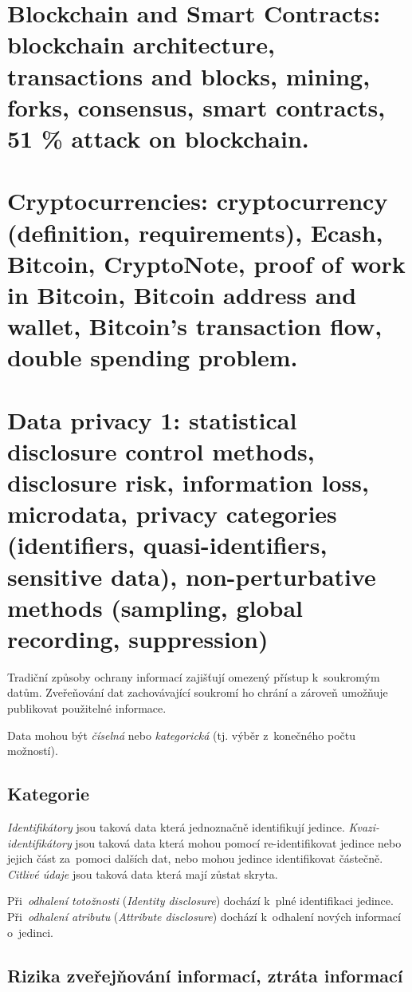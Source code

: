 \clearpage
\section{Blockchain and Smart Contracts: blockchain architecture, transactions and blocks, mining, forks, consensus, smart contracts, 51 \% attack on blockchain.}

\clearpage
\section{Cryptocurrencies: cryptocurrency (definition, requirements), Ecash, Bitcoin, CryptoNote, proof of work in Bitcoin, Bitcoin address and wallet, Bitcoin’s transaction flow, double spending problem.}



\clearpage
\section{Data privacy 1: statistical disclosure control methods, disclosure risk, information loss, microdata, privacy categories (identifiers, quasi-identifiers, sensitive data), non-perturbative methods (sampling, global recording, suppression)}

Tradiční způsoby ochrany informací zajišťují omezený přístup k~soukromým datům.
Zveřeňování dat zachovávající soukromí ho chrání a zároveň umožňuje publikovat použitelné informace.

Data mohou být \emph{číselná} nebo \emph{kategorická} (tj. výběr z~konečného počtu možností).


\subsection{Kategorie}

\emph{Identifikátory} jsou taková data která jednoznačně identifikují jedince.
\emph{Kvazi-identifikátory} jsou taková data která mohou pomocí re-identifikovat jedince nebo jejich část za~pomoci dalších dat, nebo mohou jedince identifikovat částečně.
\emph{Citlivé údaje} jsou taková data která mají zůstat skryta.

Při~\emph{odhalení totožnosti} (\emph{Identity disclosure}) dochází k~plné identifikaci jedince.
Při~\emph{odhalení atributu} (\emph{Attribute disclosure}) dochází k~odhalení nových informací o~jedinci.


\subsection{Rizika zveřejňování informací, ztráta informací}

